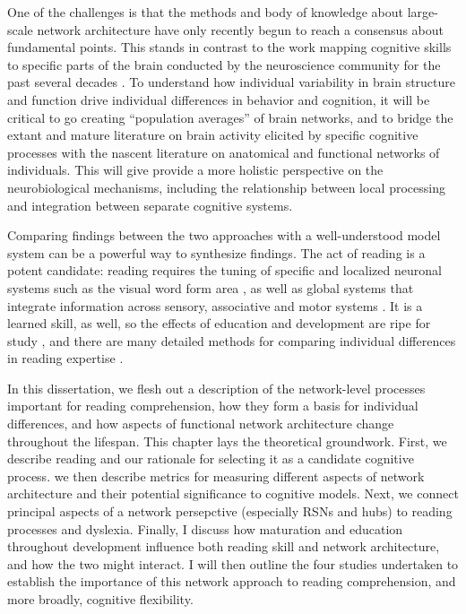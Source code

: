 One of the challenges is that the methods and body of knowledge about large-scale network architecture have only recently begun to reach a consensus about fundamental points. This stands in contrast to the work mapping cognitive skills to specific parts of the brain conducted by the neuroscience community for the past several decades \citep{Yarkoni2011}. To understand how individual variability in brain structure and function drive individual differences in behavior and cognition, it will be critical to go creating ``population averages'' of brain networks, and to bridge the extant and mature literature on brain activity elicited by specific cognitive processes with the nascent literature on anatomical and functional networks of individuals. This will give provide a more holistic perspective on the neurobiological mechanisms, including the relationship between local processing and integration between separate cognitive systems. 

Comparing findings between the two approaches with a well-understood model system can be a powerful way to synthesize findings. The act of reading is a potent candidate: reading requires the tuning of specific and localized neuronal systems such as the visual word form area \citep{McCandliss2003}, as well as global systems that integrate information across sensory, associative and motor systems \citep{Price2012}. It is a learned skill, as well, so the effects of education and development are ripe for study \citep{Saygin2016}, and there are many detailed methods for comparing individual differences in reading expertise \citep{Woodcock1998}. 

In this dissertation, we flesh out a description of the network-level processes important for reading comprehension, how they form a basis for individual differences, and how aspects of functional network architecture change throughout the lifespan. This chapter lays the theoretical groundwork. First, we describe reading and our rationale for selecting it as a candidate cognitive process. we then describe metrics for measuring different aspects of network architecture and their potential significance to cognitive models. Next, we connect principal aspects of a network persepctive (especially RSNs and hubs) to reading processes and dyslexia. Finally, I discuss how maturation and education throughout development influence both reading skill and network architecture, and how the two might interact. I will then outline the four studies undertaken to establish the importance of this network approach to reading comprehension, and more broadly, cognitive flexibility.

